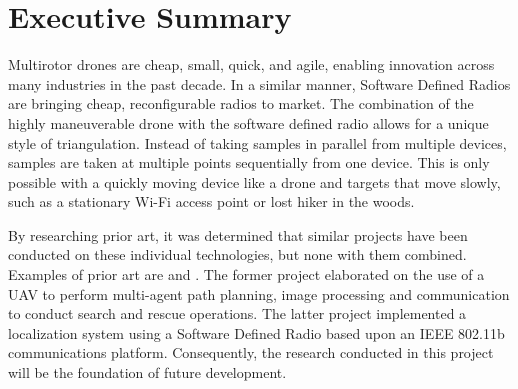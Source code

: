 \chapter*{Executive Summary}
Multirotor drones are cheap, small, quick, and agile, enabling innovation across many industries in the past decade. In a similar manner, Software Defined Radios are bringing cheap, reconfigurable radios to market. The combination of the highly maneuverable drone with the software defined radio allows for a unique style of triangulation. Instead of taking samples in parallel from multiple devices, samples are taken at multiple points sequentially from one device. This is only possible with a quickly moving device like a drone and targets that move slowly, such as a stationary Wi-Fi access point or lost hiker in the woods. \par

By researching prior art, it was determined that similar projects have been conducted on these individual technologies, but none with them combined. Examples of prior art are \cite{path_planning_snr_mqp} and \cite{sdr_localization_mqp}. The former project elaborated on the use of a UAV to perform multi-agent path planning, image processing and communication to conduct search and rescue operations. The latter project implemented a localization system using a Software Defined Radio based upon an IEEE 802.11b communications platform. Consequently, the research conducted in this project will be the foundation of future development. \par

